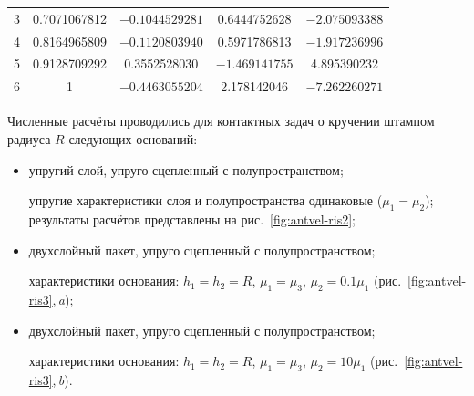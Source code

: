 \begin{table}[h!]
\begin{minipage}[h]{115mm}
\begin{tabular}{c||c|c|c|c}
3 & 0.7071067812 & $-0.1044529281$ & 0.6444752628 & $-2.075093388$ \\

4 & 0.8164965809 & $-0.1120803940$ & 0.5971786813 & $-1.917236996$ \\

5 & 0.9128709292 & 0.3552528030 & $-1.469141755$ & 4.895390232 \\

6 & 1 & $-0.4463055204$ & 2.178142046 & $-7.262260271$ \\

\hline

\end{tabular}

\end{minipage}

\end{table}









Численные расчёты проводились для контактных задач о кручении штампом радиуса $R$ следующих оснований:

\begin{itemize}

\item[1)] упругий слой,  упруго сцепленный с полупространством; 

упругие характеристики слоя и полупространства одинаковые ($\mu_{1}=\mu_{2}$); результаты расчётов представлены на рис.~\ref{fig:antvel-ris2};



\item[2)] двухслойный пакет,  упруго сцепленный с полупространством; 

характеристики основания: $h_{1}=h_{2}=R$, $\mu_{1}=\mu_{3}$, $\mu_{2}=0.1\mu_{1}$  (рис.~\ref{fig:antvel-ris3},\,{\sl a});



\item[3)] двухслойный пакет,  упруго сцепленный с полупространством;

характеристики основания: $h_{1}=h_{2}=R$, $\mu_{1}=\mu_{3}$, $\mu_{2}=10\mu_{1}$  (рис.~\ref{fig:antvel-ris3},\,{\sl b}).







\end{itemize}







